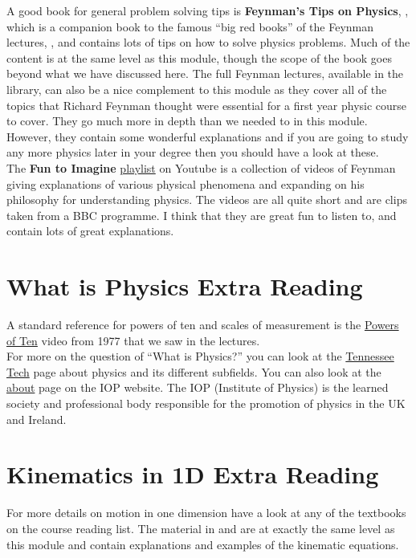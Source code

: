 A good book for general problem solving tips is \textbf{Feynman's Tips on Physics}, \citep{feynmantips}, which is a companion book to the famous ``big red books'' of the Feynman lectures, \citep{feynmanv1,feynmanv2,feynmanv3}, and contains lots of tips on how to solve physics problems. Much of the content is at the same level as this module, though the scope of the book goes beyond what we have discussed here.  The full Feynman lectures, available in the library, can also be a nice complement to this module as they cover all of the topics that Richard Feynman thought were essential for a first year physic course to cover. They go much more in depth than we needed to in this module. However, they contain some wonderful explanations and if you are going to study any more physics later in your degree then you should have a look at these.\\

The \textbf{Fun to Imagine} \href{https://www.youtube.com/playlist?app=desktop&list=PL2D30B1DEFFDA0310}{playlist} on Youtube is a collection of videos of Feynman giving explanations of various physical phenomena and expanding on his philosophy for understanding physics.  The videos are all quite short and are clips taken from a BBC programme. I think that they are great fun to listen to, and contain lots of great explanations.

\section{What is Physics Extra Reading}
A standard reference for powers of ten and scales of measurement is the \href{https://www.youtube.com/watch?v=0fKBhvDjuy0}{Powers of Ten} video from 1977 that we saw in the lectures.\\

For more on the question of ``What is Physics?'' you can look at the \href{https://www.tntech.edu/cas/physics/aboutphys/about-physics.php}{Tennessee Tech} page about physics and its different subfields. You can also look at the \href{https://www.iop.org/about}{about} page on the IOP website. The IOP (Institute of Physics) is the learned society and professional body responsible for the promotion of physics in the UK and Ireland.

\section{Kinematics in 1D Extra Reading}
For more details on motion in one dimension have a look at any of the textbooks on the course reading list. The material in \citep{breithaupt2016aqa} and \citep{breithaupt2016aqa_AS} are at exactly the same level as this module and contain explanations and examples of the kinematic equations.\\


